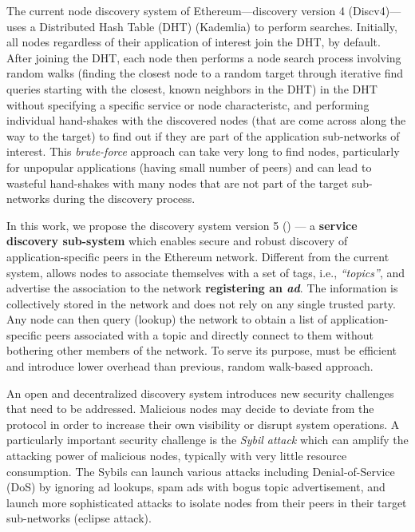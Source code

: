  The current node discovery system of Ethereum---\ie discovery version 4 (Discv4)---uses a Distributed Hash Table (DHT) (Kademlia) to perform searches. Initially, all nodes regardless of their application of interest join the DHT, by default. After joining the DHT, each node then performs a node search process involving random walks (\ie finding the closest node to a random target through iterative find queries starting with the closest, known neighbors in the DHT) in the DHT without specifying a specific service or node characteristc, and performing individual hand-shakes with the discovered nodes (that are come across along the way to the target) to find out if they are part of the application sub-networks of interest. This \emph{brute-force} approach can take very long to find nodes, particularly for unpopular applications (\ie having small number of peers) and can lead to wasteful hand-shakes with many nodes that are not part of the target sub-networks during the discovery process. 

 In this work, we propose the discovery system version 5 (\textit{\sysname}) --- a \textbf{service discovery sub-system} which enables secure and robust discovery of application-specific peers in the Ethereum network. Different from the current system, \sysname allows nodes to associate themselves with a set of tags, i.e., \textit{``topics''}, and advertise the association to the network \ie  \textbf{registering an \emph{ad}}. The information is collectively stored in the network and does not rely on any single trusted party. Any node can then query (\ie lookup) the network to obtain a list of application-specific peers associated with a topic and directly connect to them without bothering other members of the network. To serve its purpose, \sysname must be efficient and introduce lower overhead than previous, random walk-based approach. 

An open and decentralized discovery system introduces new security challenges that need to be addressed. Malicious nodes may decide to deviate from the protocol in order to increase their own visibility or disrupt system operations. A particularly important security challenge is the \textit{Sybil attack} which can amplify the attacking power of malicious nodes, typically with very little resource consumption. The Sybils can launch various attacks including Denial-of-Service (DoS) by ignoring ad lookups, spam ads with bogus topic advertisement, and launch more sophisticated attacks to isolate nodes from their peers in their target sub-networks (\ie eclipse attack). 

